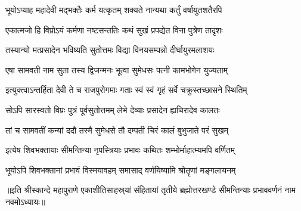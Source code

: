 \begin{center}
\twolineshloka
{भूयोऽप्याह महादेवी मद्भक्तैः कर्म यत्कृतम्}
{शक्यते नान्यथा कर्तुं वर्षायुतशतैरपि} %

\twolineshloka
{एकात्मजो हि विप्रोऽयं कर्मणा नष्टसन्ततिः}
{कथं सुखं प्रपद्येत विना पुत्रेण तादृशः} %

\twolineshloka
{तस्यान्यो मत्प्रसादेन भविष्यति सुतोत्तमः}
{विद्या विनयसम्पन्नो दीर्घायुरमलाशयः} %

\twolineshloka
{एषा सामवती नाम सुता तस्य द्विजन्मनः}
{भूत्वा सुमेधसः पत्नी कामभोगेन युज्यताम्} %

\twolineshloka
{इत्युक्त्वाऽन्तर्हिता देवी ते च राजपुरोगमाः}
{गताः स्वं स्वं गृहं सर्वे चक्रुस्तच्छासने स्थितिम्} %

\twolineshloka
{सोऽपि सारस्वतो विप्रः पुत्रं पूर्वसुतोत्तमम्}
{लेभे देव्याः प्रसादेन ह्यचिरादेव कालतः} %

\twolineshloka
{तां च सामवतीं कन्यां ददौ तस्मै सुमेधसे}
{तौ दम्पती चिरं कालं बुभुजाते परं सुखम्} %

\twolineshloka
{इत्येष शिवभक्तायाः सीमन्तिन्या नृपस्त्रियाः}
{प्रभावः कथितः शम्भोर्माहात्म्यमपि वर्णितम्} %

\twolineshloka
{भूयोऽपि शिवभक्तानां प्रभावं विस्मयावहम्}
{समासाद् वर्णयिष्यामि श्रोतॄणां मङ्गलायनम्} %

{॥इति श्रीस्कान्दे महापुराणे एकाशीतिसाहस्र्यां संहितायां तृतीये ब्रह्मोत्तरखण्डे सीमन्तिन्याः प्रभाववर्णनं नाम नवमोऽध्यायः॥} 

\hyperref[sec:somvara_vratha_katha]{\closesub}

\end{center}